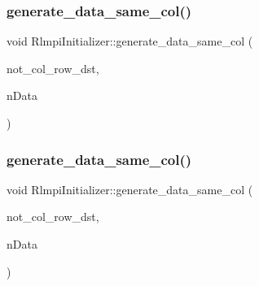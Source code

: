 \mbox{\label{classRlmpiInitializer_a68f0277b57d6a61af97846cd9e100ddc}} 
\subsubsection{\texorpdfstring{generate\_data\_same\_col()}{generate\_data\_same\_col()}\hspace{0.1cm}{\footnotesize\ttfamily [3/4]}}
{\footnotesize\ttfamily void Rlmpi\+Initializer\+::generate\+\_\+data\+\_\+same\+\_\+col (\begin{DoxyParamCaption}\item[{const vector$<$ vector$<$ \mbox{\hyperlink{include_2RlmpiShared_8h_a69782ffde89d45e86308f10afedf08a6}{int8\+L\+DM}} $>$ $>$ \&}]{not\+\_\+col\+\_\+row\+\_\+dst,  }\item[{const vector$<$ vector$<$ \mbox{\hyperlink{include_2RlmpiShared_8h_a69782ffde89d45e86308f10afedf08a6}{int8\+L\+DM}} $>$ $>$ \&}]{n\+Data }\end{DoxyParamCaption})\hspace{0.3cm}{\ttfamily [protected]}}

\mbox{\label{classRlmpiInitializer_a68f0277b57d6a61af97846cd9e100ddc}} 
\subsubsection{\texorpdfstring{generate\_data\_same\_col()}{generate\_data\_same\_col()}\hspace{0.1cm}{\footnotesize\ttfamily [4/4]}}
{\footnotesize\ttfamily void Rlmpi\+Initializer\+::generate\+\_\+data\+\_\+same\+\_\+col (\begin{DoxyParamCaption}\item[{const vector$<$ vector$<$ \mbox{\hyperlink{include_2RlmpiShared_8h_a69782ffde89d45e86308f10afedf08a6}{int8\+L\+DM}} $>$ $>$ \&}]{not\+\_\+col\+\_\+row\+\_\+dst,  }\item[{const vector$<$ vector$<$ \mbox{\hyperlink{include_2RlmpiShared_8h_a69782ffde89d45e86308f10afedf08a6}{int8\+L\+DM}} $>$ $>$ \&}]{n\+Data }\end{DoxyParamCaption})\hspace{0.3cm}{\ttfamily [protected]}}

